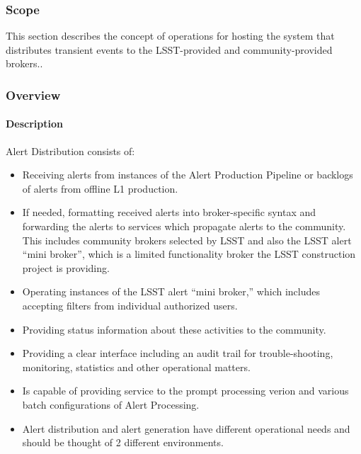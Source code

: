 \subsubsection{Scope}
This section describes the concept of operations for hosting the system that distributes transient events to the LSST-provided and community-provided brokers..

\subsubsection{Overview}

\paragraph{Description}

Alert Distribution consists of:
\begin{itemize}

\item Receiving alerts from instances of the Alert Production Pipeline or backlogs of alerts from offline L1 production.

\item If needed, formatting received alerts into broker-specific syntax and forwarding the alerts to services which propagate alerts to the community. This includes  community brokers selected by LSST and also  the LSST alert “mini broker”, which is a limited functionality broker the LSST construction project is providing.

\item Operating instances of the LSST alert “mini broker,” which includes accepting filters from individual authorized users.

\item Providing status information about these activities to the community.

\item Providing a clear interface including an audit trail for trouble-shooting, monitoring, statistics and other operational matters.

\item Is capable of providing service to the prompt processing verion and various batch configurations of Alert Processing.
\item Alert distribution and alert generation have different operational needs and should be thought of 2 different environments.

\end{itemize}

